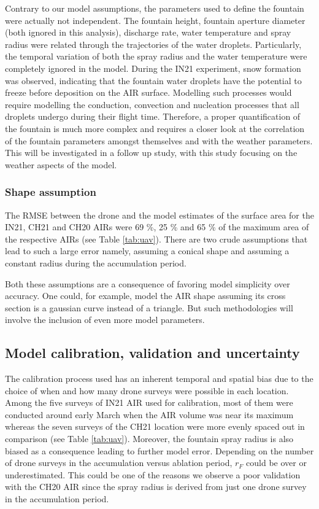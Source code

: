 \documentclass[utf8]{frontiersSCNS}
\begin{document}
Contrary to our model assumptions, the parameters used to define the fountain were actually not independent. The
fountain height, fountain aperture diameter (both ignored in this analysis), discharge rate, water temperature
and spray radius were related through the trajectories of the water droplets. Particularly, the temporal
variation of both the spray radius and the water temperature were completely ignored in the model. During the
IN21 experiment, snow formation was observed, indicating that the fountain water droplets have the potential to
freeze before deposition on the AIR surface. Modelling such processes would require modelling the conduction,
convection and nucleation processes that all droplets undergo during their flight time. Therefore, a proper
quantification of the fountain is much more complex and requires a closer look at the correlation of the
fountain parameters amongst themselves and with the weather parameters. This will be investigated in a follow up
study, with this study focusing on the weather aspects of the model.

\subsubsection{Shape assumption}

The RMSE between the drone and the model estimates of the surface area for the IN21, CH21 and CH20 AIRs were 69
\%, 25 \% and 65 \% of the maximum area of the respective AIRs (see Table \ref{tab:uav}). There are two crude
assumptions that lead to such a large error namely, assuming a conical shape and assuming a constant radius
during the accumulation period.

Both these assumptions are a consequence of favoring model simplicity over accuracy. One could, for example,
model the AIR shape assuming its cross section is a gaussian curve instead of a triangle.  But such
methodologies will involve the inclusion of even more model parameters.

\subsection{Model calibration, validation and uncertainty}

The calibration process used has an inherent temporal and spatial bias due to the choice of when and how many
drone surveys were possible in each location. Among the five surveys of IN21 AIR used for calibration, most of them
were conducted around early March when the AIR volume was near its maximum whereas the seven surveys of the CH21
location were more evenly spaced out in comparison (see Table \ref{tab:uav}). Moreover, the fountain spray
radius is also biased as a consequence leading to further model error. Depending on the number of drone surveys
in the accumulation versus ablation period, $r_F$ could be over or underestimated. This could be one of the
reasons we observe a poor validation with the CH20 AIR since the spray radius is derived from just one drone
survey in the accumulation period.
\end{document}
